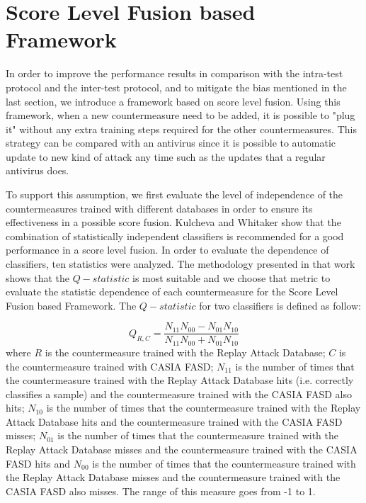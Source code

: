 \section{Score Level Fusion based Framework}
\label{sec:framework}

In order to improve the performance results in comparison with the intra-test protocol and the inter-test protocol, and to mitigate the bias mentioned in the last section, we introduce a framework based on score level fusion. Using this framework, when a new countermeasure need to be added, it is possible to "plug it" without any extra training steps required for the other countermeasures. This strategy can be compared with an antivirus since it is possible to automatic update to new kind of attack any time such as the updates that a regular antivirus does.

To support this assumption, we first evaluate the level of independence of the countermeasures trained with different databases in order to ensure its effectiveness in a possible score fusion. Kulcheva and Whitaker \cite{kuncheva2003measures} show that the combination of statistically independent classifiers is recommended for a good performance in a score level fusion. In order to evaluate the dependence of classifiers, ten statistics were analyzed. The methodology presented in that work shows that the $Q-statistic$ is most suitable and we choose that metric to evaluate the statistic dependence of each countermeasure for the Score Level Fusion based Framework. The $Q-statistic$ for two classifiers is defined as follow:

\begin{equation}
\label{eq:Qstatistic}
Q_{R,C} = \frac{N_{11}N_{00} - N_{01}N_{10}}{N_{11}N_{00} +N_{01}N_{10}}
\end{equation}
where $R$ is the countermeasure trained with the Replay Attack Database; $C$ is the countermeasure trained with CASIA FASD; $N_{11}$ is the number of times that the countermeasure trained with the Replay Attack Database hits (i.e. correctly classifies a sample) and the countermeasure trained with the CASIA FASD also hits; $N_{10}$ is the number of times that the countermeasure trained with the Replay Attack Database hits and the countermeasure trained with the CASIA FASD misses; $N_{01}$ is the number of times that the countermeasure trained with the Replay Attack Database misses and the countermeasure trained with the CASIA FASD hits and $N_{00}$ is the number of times that the countermeasure trained with the Replay Attack Database misses and the countermeasure trained with the CASIA FASD also misses. The range of this measure goes from -1 to 1.

